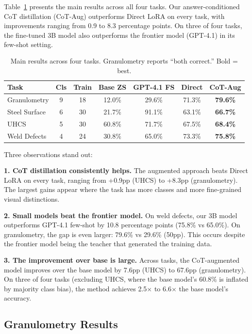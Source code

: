 \documentclass{bmvc2k}
\begin{document}
Table~\ref{tab:main_results} presents the main results across all four tasks. Our answer-conditioned CoT distillation (CoT-Aug) outperforms Direct LoRA on every task, with improvements ranging from 0.9 to 8.3 percentage points. On three of four tasks, the fine-tuned 3B model also outperforms the frontier model (GPT-4.1) in its few-shot setting.

\begin{table}[!hbp]
\centering
\scriptsize
\begin{tabular}{lcccccc}
\toprule
Task & Cls & Train & Base ZS & GPT-4.1 FS & Direct & CoT-Aug \\
\midrule
Granulometry & 9 & 18 & 12.0\% & 29.6\% & 71.3\% & \textbf{79.6\%} \\
Steel Surface & 6 & 30 & 21.7\% & 91.1\% & 63.1\% & \textbf{66.7\%} \\
UHCS & 5 & 30 & 60.8\% & 71.7\% & 67.5\% & \textbf{68.4\%} \\
Weld Defects & 4 & 24 & 30.8\% & 65.0\% & 73.3\% & \textbf{75.8\%} \\
\bottomrule
\end{tabular}
\caption{Main results across four tasks. Granulometry reports ``both correct.'' Bold = best.}
\label{tab:main_results}
\end{table}

Three observations stand out:

\noindent\textbf{1. CoT distillation consistently helps.} The augmented approach beats Direct LoRA on every task, ranging from +0.9pp (UHCS) to +8.3pp (granulometry). The largest gains appear where the task has more classes and more fine-grained visual distinctions.

\noindent\textbf{2. Small models beat the frontier model.} On weld defects, our 3B model outperforms GPT-4.1 few-shot by 10.8 percentage points (75.8\% vs 65.0\%). On granulometry, the gap is even larger: 79.6\% vs 29.6\% (50pp). This occurs despite the frontier model being the teacher that generated the training data.

\noindent\textbf{3. The improvement over base is large.} Across tasks, the CoT-augmented model improves over the base model by 7.6pp (UHCS) to 67.6pp (granulometry). On three of four tasks (excluding UHCS, where the base model's 60.8\% is inflated by majority class bias), the method achieves 2.5$\times$ to 6.6$\times$ the base model's accuracy.

\subsection{Granulometry Results}
\end{document}
